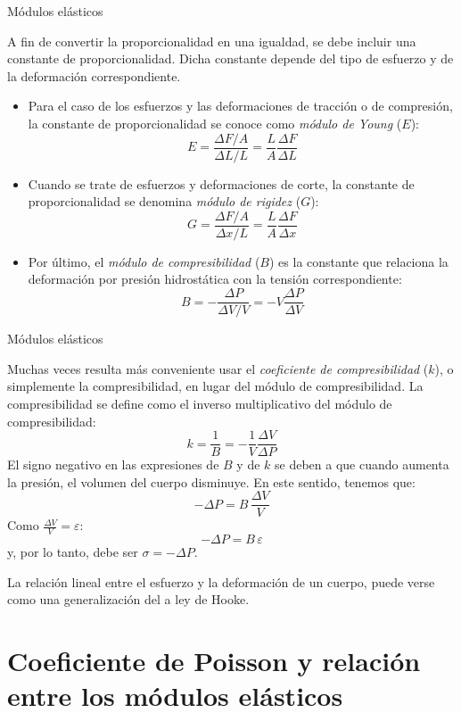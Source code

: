 \documentclass[11pt,handout,aspectratio=1610]{beamer}
\newcommand{\vs}{\vspace{11pt}}
\begin{document}
\begin{frame}{Módulos elásticos}

    A fin de convertir la proporcionalidad en una igualdad, se debe incluir una constante de proporcionalidad. Dicha constante depende del tipo de esfuerzo y de la deformación correspondiente.

    \begin{itemize}
        \item Para el caso de los esfuerzos y las deformaciones de tracción o de compresión, la constante de proporcionalidad se conoce como \emph{módulo de Young} ($E$): $$ E = \frac{\Delta F/A}{\Delta L /L} = \frac{L}{A} \frac{\Delta F}{\Delta L} $$
        \item Cuando se trate de esfuerzos y deformaciones de corte, la constante de proporcionalidad se denomina \emph{módulo de rigidez} ($G$): $$ G = \frac{\Delta F/A}{\Delta x / L} = \frac{L}{A} \frac{\Delta F}{\Delta x}$$
        \item Por último, el \emph{módulo de compresibilidad} ($B$) es la constante que relaciona la deformación por presión hidrostática con la tensión correspondiente: $$ B = - \frac{\Delta P}{\Delta V / V} = - V \frac{\Delta P}{\Delta V} $$
    \end{itemize}

\end{frame}

\begin{frame}{Módulos elásticos}

    Muchas veces resulta más conveniente usar el \emph{coeficiente de compresibilidad} ($k$), o simplemente la compresibilidad, en lugar del módulo de compresibilidad. La compresibilidad se define como el inverso multiplicativo del módulo de compresibilidad: $$ k = \frac{1}{B} = - \frac{1}{V} \frac{\Delta V}{\Delta P} $$ El signo negativo en las expresiones de $B$ y de $k$ se deben a que cuando aumenta la presión, el volumen del cuerpo disminuye. En este sentido, tenemos que: $$ - \Delta P = B \, \frac{\Delta V}{V} $$ Como $\frac{\Delta V}{V} = \varepsilon $: $$ - \Delta P = B \, \varepsilon $$ y, por lo tanto, debe ser $\sigma = - \Delta P$.

    \vs

    La relación lineal entre el esfuerzo y la deformación de un cuerpo, puede verse como una generalización del a ley de Hooke.

\end{frame}

\section{Coeficiente de Poisson y relación entre los módulos elásticos}
\end{document}
